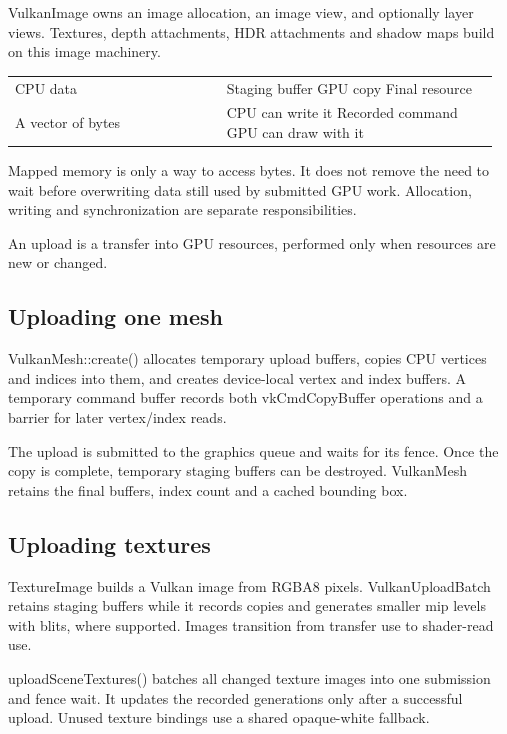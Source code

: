 \documentclass[11pt,a4paper]{article}
\begin{document}
VulkanImage owns an image allocation, an image view, and optionally layer views. Textures, depth attachments, HDR attachments and shadow maps build on this image machinery.

{\small
\begin{longtable}{@{}p{0.42\linewidth}p{0.54\linewidth}@{}}
CPU data & Staging buffer                  GPU copy                   Final resource \\
A vector of bytes & CPU can write it             Recorded command             GPU can draw with it \\
\end{longtable}
}

Mapped memory is only a way to access bytes. It does not remove the need to wait before overwriting data still used by submitted GPU work. Allocation, writing and synchronization are separate responsibilities.

\label{core-36}
An upload is a transfer into GPU resources, performed only when resources are new or changed.

\subsection*{Uploading one mesh}
VulkanMesh::create() allocates temporary upload buffers, copies CPU vertices and indices into them, and creates device-local vertex and index buffers. A temporary command buffer records both vkCmdCopyBuffer operations and a barrier for later vertex/index reads.

The upload is submitted to the graphics queue and waits for its fence. Once the copy is complete, temporary staging buffers can be destroyed. VulkanMesh retains the final buffers, index count and a cached bounding box.

\subsection*{Uploading textures}
TextureImage builds a Vulkan image from RGBA8 pixels. VulkanUploadBatch retains staging buffers while it records copies and generates smaller mip levels with blits, where supported. Images transition from transfer use to shader-read use.

uploadSceneTextures() batches all changed texture images into one submission and fence wait. It updates the recorded generations only after a successful upload. Unused texture bindings use a shared opaque-white fallback.
\end{document}
